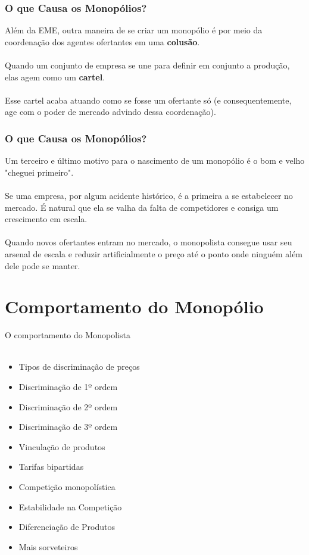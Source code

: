 \documentclass{beamer}[10]
\begin{document}
\begin{frame}
	\frametitle{O que Causa os Monopólios?}
	Além da EME, outra maneira de se criar um monopólio é por meio da coordenação dos agentes ofertantes em uma \textbf{colusão}.
	\\~\\
	Quando um conjunto de empresa se une para definir em conjunto a produção, elas agem como um \textbf{cartel}.
	\\~\\
	Esse cartel acaba atuando como se fosse um ofertante só (e consequentemente, age com o poder de mercado advindo dessa coordenação).
\end{frame}

\begin{frame}
	\frametitle{O que Causa os Monopólios?}
	Um terceiro e último motivo para o nascimento de um monopólio é o bom e velho "cheguei primeiro".
	\\~\\
	Se uma empresa, por algum acidente histórico, é a primeira a se estabelecer no mercado. É natural que ela se valha da falta de competidores e consiga um crescimento em escala.
	\\~\\
	Quando novos ofertantes entram no mercado, o monopolista consegue usar seu arsenal de escala e reduzir artificialmente o preço até o ponto onde ninguém além dele pode se manter.
\end{frame}

\section[C.Monopólio]{Comportamento do Monopólio}

\begin{frame}
	\huge O comportamento do Monopolista \normalsize
	\\~\\
	\begin{itemize}
		\item Tipos de discriminação de preços
		\item Discriminação de 1º ordem
		\item Discriminação de 2º ordem
		\item Discriminação de 3º ordem
		\item Vinculação de produtos
		\item Tarifas bipartidas
		\item Competição monopolística
		\item Estabilidade na Competição
		\item Diferenciação de Produtos
		\item Mais sorveteiros
	\end{itemize}
\end{frame}
\end{document}

